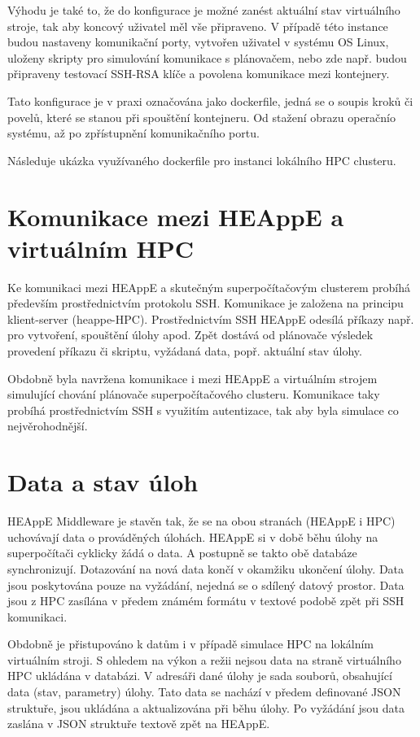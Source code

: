 Výhodu je také to, že do konfigurace je možné zanést aktuální stav virtuálního stroje, tak aby koncový uživatel měl vše připraveno. V případě této instance budou nastaveny komunikační porty, vytvořen uživatel v systému OS Linux, uloženy skripty pro simulování komunikace s plánovačem, nebo zde např. budou připraveny testovací SSH-RSA klíče a povolena komunikace mezi kontejnery.

Tato konfigurace je v praxi označována jako dockerfile, jedná se o soupis kroků či povelů, které se stanou při spouštění kontejneru. Od stažení obrazu operačnío systému, až po zpřístupnění komunikačního portu.

Následuje ukázka využívaného dockerfile pro instanci lokálního HPC clusteru.

\hfill \break


\section{Komunikace mezi HEAppE a virtuálním HPC}
Ke komunikaci mezi HEAppE a skutečným superpočítačovým clusterem probíhá především prostřednictvím protokolu SSH. Komunikace je založena na principu klient-server (heappe-HPC). Prostřednictvím SSH HEAppE odesílá příkazy např. pro vytvoření, spouštění úlohy apod. Zpět dostává od plánovače výsledek provedení příkazu či skriptu, vyžádaná data, popř. aktuální stav úlohy.

Obdobně byla navržena komunikace i mezi HEAppE a virtuálním strojem simulující chování plánovače superpočítačového clusteru. Komunikace taky probíhá prostřednictvím SSH s využitím autentizace, tak aby byla simulace co nejvěrohodnější.

\section{Data a stav úloh}
HEAppE Middleware je stavěn tak, že se na obou stranách (HEAppE i HPC) uchovávají data o prováděných úlohách. HEAppE si v době běhu úlohy na superpočítači cyklicky žádá o data. A postupně se takto obě databáze synchronizují. Dotazování na nová data končí v okamžiku ukončení úlohy. Data jsou poskytována pouze na vyžádání, nejedná se o sdílený datový prostor. Data jsou z HPC zasílána v předem známém formátu v textové podobě zpět při SSH komunikaci.

Obdobně je přistupováno k datům i v případě simulace HPC na lokálním virtuálním stroji. S ohledem na výkon a režii nejsou data na straně virtuálního HPC ukládána v databázi. V adresáři dané úlohy je sada souborů, obsahující data (stav, parametry) úlohy. Tato data se nachází v předem definované JSON struktuře, jsou ukládána a aktualizována při běhu úlohy. Po vyžádání jsou data zaslána v JSON struktuře textově zpět na HEAppE.

